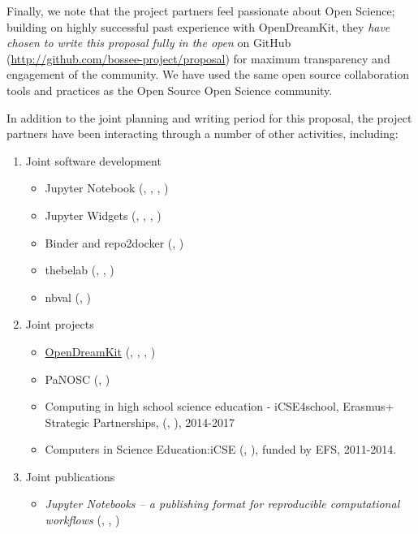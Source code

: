 Finally, we note that the project partners feel passionate about Open Science;
building on highly successful past experience with OpenDreamKit, they
\emph{have chosen to write this proposal fully in the open} on GitHub
(\href{http://github.com/bossee-project/proposal}{http://github.com/bossee-project/proposal}) for maximum transparency
and engagement of the community.
We have used the same open source collaboration tools and practices
as the Open Source Open Science community.

In addition to the joint planning and writing period for this
proposal, the project partners have been interacting through a number of
other activities, including:

\begin{enumerate}
\item Joint software development
  \begin{itemize}
  \item Jupyter Notebook (, , , )
  \item Jupyter Widgets (, , , )
  \item Binder and repo2docker (, )
  \item thebelab (, , )
  \item nbval (, )
  \end{itemize}

\item Joint projects
  \begin{itemize}
  \item \href{http://opendreamkit.org}{OpenDreamKit} (, , , )
  \item PaNOSC (, )
  \item Computing in high school science education - iCSE4school, Erasmus+ Strategic Partnerships,
  (, ), 2014-2017
  \item Computers in Science Education:iCSE (, ), funded by EFS, 2011-2014.
    \end{itemize}

\item Joint publications
  \begin{itemize}
  \item \emph{Jupyter Notebooks -- a publishing format for
      reproducible computational workflows} \cite{Kluyver2016} (, , )
  \end{itemize}


\end{enumerate}
